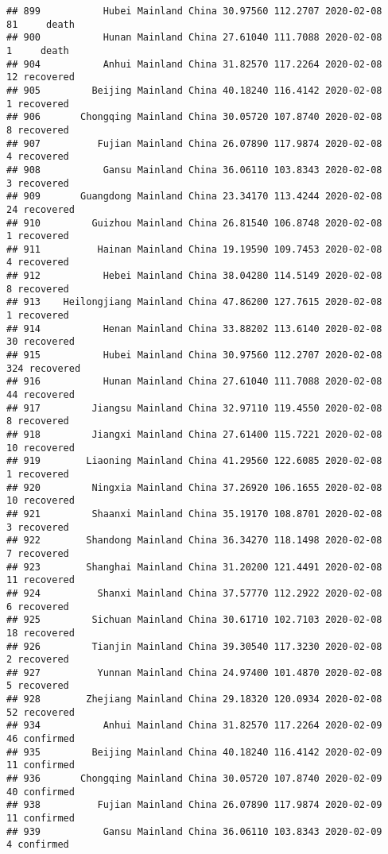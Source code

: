\documentclass[
]{article}
\begin{document}
\begin{verbatim}
## 899           Hubei Mainland China 30.97560 112.2707 2020-02-08    81     death
## 900           Hunan Mainland China 27.61040 111.7088 2020-02-08     1     death
## 904           Anhui Mainland China 31.82570 117.2264 2020-02-08    12 recovered
## 905         Beijing Mainland China 40.18240 116.4142 2020-02-08     1 recovered
## 906       Chongqing Mainland China 30.05720 107.8740 2020-02-08     8 recovered
## 907          Fujian Mainland China 26.07890 117.9874 2020-02-08     4 recovered
## 908           Gansu Mainland China 36.06110 103.8343 2020-02-08     3 recovered
## 909       Guangdong Mainland China 23.34170 113.4244 2020-02-08    24 recovered
## 910         Guizhou Mainland China 26.81540 106.8748 2020-02-08     1 recovered
## 911          Hainan Mainland China 19.19590 109.7453 2020-02-08     4 recovered
## 912           Hebei Mainland China 38.04280 114.5149 2020-02-08     8 recovered
## 913    Heilongjiang Mainland China 47.86200 127.7615 2020-02-08     1 recovered
## 914           Henan Mainland China 33.88202 113.6140 2020-02-08    30 recovered
## 915           Hubei Mainland China 30.97560 112.2707 2020-02-08   324 recovered
## 916           Hunan Mainland China 27.61040 111.7088 2020-02-08    44 recovered
## 917         Jiangsu Mainland China 32.97110 119.4550 2020-02-08     8 recovered
## 918         Jiangxi Mainland China 27.61400 115.7221 2020-02-08    10 recovered
## 919        Liaoning Mainland China 41.29560 122.6085 2020-02-08     1 recovered
## 920         Ningxia Mainland China 37.26920 106.1655 2020-02-08    10 recovered
## 921         Shaanxi Mainland China 35.19170 108.8701 2020-02-08     3 recovered
## 922        Shandong Mainland China 36.34270 118.1498 2020-02-08     7 recovered
## 923        Shanghai Mainland China 31.20200 121.4491 2020-02-08    11 recovered
## 924          Shanxi Mainland China 37.57770 112.2922 2020-02-08     6 recovered
## 925         Sichuan Mainland China 30.61710 102.7103 2020-02-08    18 recovered
## 926         Tianjin Mainland China 39.30540 117.3230 2020-02-08     2 recovered
## 927          Yunnan Mainland China 24.97400 101.4870 2020-02-08     5 recovered
## 928        Zhejiang Mainland China 29.18320 120.0934 2020-02-08    52 recovered
## 934           Anhui Mainland China 31.82570 117.2264 2020-02-09    46 confirmed
## 935         Beijing Mainland China 40.18240 116.4142 2020-02-09    11 confirmed
## 936       Chongqing Mainland China 30.05720 107.8740 2020-02-09    40 confirmed
## 938          Fujian Mainland China 26.07890 117.9874 2020-02-09    11 confirmed
## 939           Gansu Mainland China 36.06110 103.8343 2020-02-09     4 confirmed

\end{verbatim}
\end{document}
